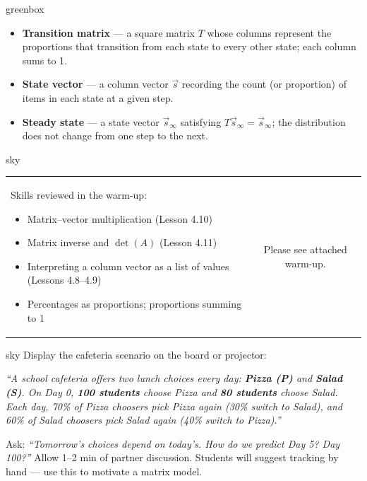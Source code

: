 \documentclass[10pt]{article}
\begin{document}
\begin{skillbox}{greenbox}
\begin{itemize}[leftmargin=1.4em, itemsep=2pt]
  \item \textbf{Transition matrix} --- a square matrix $T$ whose columns represent the proportions that transition from each state to every other state; each column sums to 1.
  \item \textbf{State vector} --- a column vector $\vec{s}$ recording the count (or proportion) of items in each state at a given step.
  \item \textbf{Steady state} --- a state vector $\vec{s}_\infty$ satisfying $T\vec{s}_\infty = \vec{s}_\infty$; the distribution does not change from one step to the next.
\end{itemize}
\end{skillbox}

\begin{skillbox}{sky}
    \begin{tabularx}{\linewidth}{@{}X c@{}}
        \begin{minipage}[t]{0.55\linewidth}\vspace{0pt}
        Skills reviewed in the warm-up:
        \begin{itemize}[leftmargin=1.4em, itemsep=1pt]
          \item Matrix--vector multiplication (Lesson 4.10)
          \item Matrix inverse and $\det(A)$ (Lesson 4.11)
          \item Interpreting a column vector as a list of values (Lessons 4.8--4.9)
          \item Percentages as proportions; proportions summing to 1
        \end{itemize}
        \end{minipage}
        &
        \begin{minipage}[t]{0.38\linewidth}\vspace{0pt}\centering
            Please see attached warm-up.
        \end{minipage}
    \end{tabularx}
\end{skillbox}

\begin{skillbox}{sky}
Display the cafeteria scenario on the board or projector:

\medskip
\textit{``A school cafeteria offers two lunch choices every day: \textbf{Pizza (P)} and \textbf{Salad (S)}.
On Day 0, \textbf{100 students} choose Pizza and \textbf{80 students} choose Salad.
Each day, 70\% of Pizza choosers pick Pizza again (30\% switch to Salad),
and 60\% of Salad choosers pick Salad again (40\% switch to Pizza).''}

\medskip
Ask: \textit{``Tomorrow's choices depend on today's. How do we predict Day 5? Day 100?''}
Allow 1--2 min of partner discussion. Students will suggest tracking by hand --- use this to motivate a matrix model.
\end{skillbox}
\end{document}
